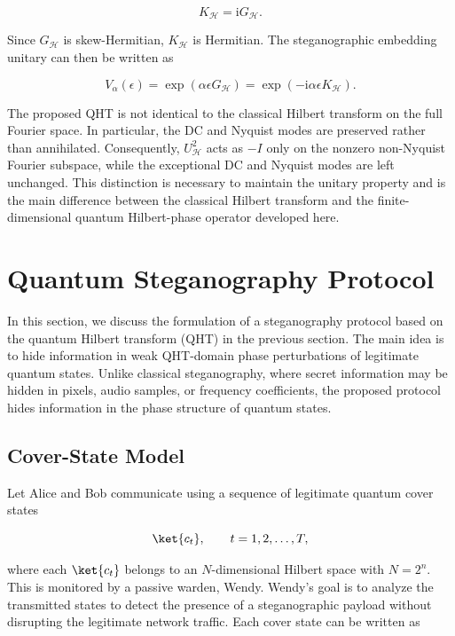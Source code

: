 \documentclass[11pt]{article}
\theoremstyle{plain}
\theoremstyle{definition}
\theoremstyle{remark}
\begin{document}
\begin{equation}
K_{\mathcal H}
=
\mathrm{i}G_{\mathcal H}.
\end{equation}

Since $G_{\mathcal H}$ is skew-Hermitian, $K_{\mathcal H}$ is Hermitian. The steganographic embedding unitary can then be written as

\begin{equation}
V_{\alpha}(\epsilon)
=
\exp\left(
\alpha\epsilon G_{\mathcal H}
\right)
=
\exp\left(
-\mathrm{i}\alpha\epsilon K_{\mathcal H}
\right).
\end{equation}

The proposed QHT is not identical to the classical Hilbert transform on the full Fourier space. In particular, the DC and Nyquist modes are preserved rather than annihilated. Consequently, $U_{\mathcal H}^{2}$ acts as $-I$ only on the nonzero non-Nyquist Fourier subspace, while the exceptional DC and Nyquist modes are left unchanged. This distinction is necessary to maintain the unitary property and is the main difference between the classical Hilbert transform and the finite-dimensional quantum Hilbert-phase operator developed here.

\section{Quantum Steganography Protocol}
\label{QSP}

In this section, we discuss the formulation of a steganography protocol based on the quantum Hilbert transform (QHT) in the previous section. The main idea is to hide information in weak QHT-domain phase perturbations of legitimate quantum states. Unlike classical steganography, where secret information may be hidden in pixels, audio samples, or frequency coefficients, the proposed protocol hides information in the phase structure of quantum states.

\subsection{Cover-State Model}
\label{Sec:coverstate}

Let Alice and Bob communicate using a sequence of legitimate quantum cover states

\begin{equation}
\ket{c_t},
\qquad
t=1,2,\ldots,T,
\end{equation}

where each $\ket{c_t}$ belongs to an $N$-dimensional Hilbert space with $N=2^n$. This is monitored by a passive warden, Wendy. Wendy's goal is to analyze the transmitted states to detect the presence of a steganographic payload without disrupting the legitimate network traffic. Each cover state can be written as
\end{document}
